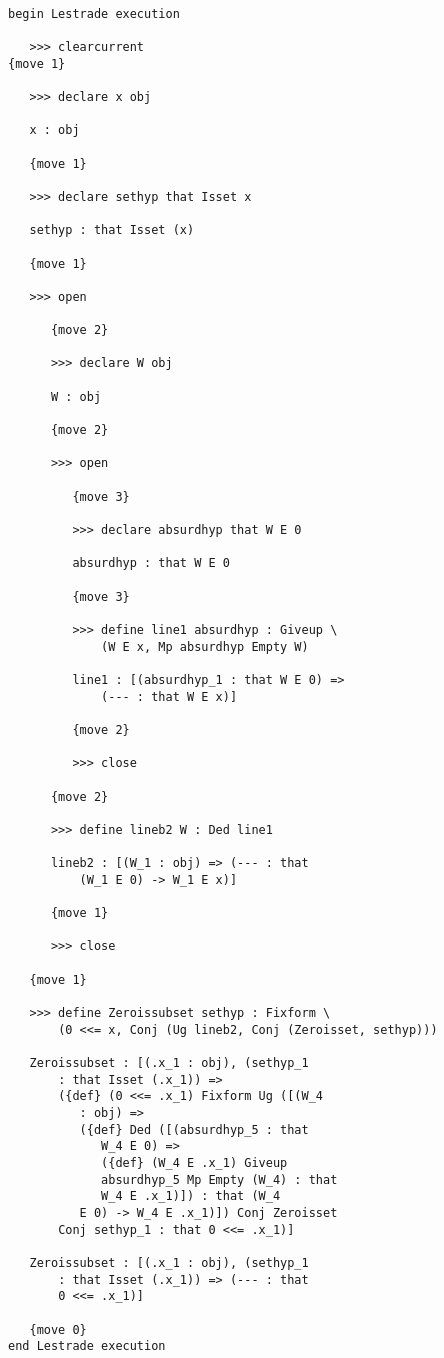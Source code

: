 \documentclass[12pt]{article}
\begin{document}
\begin{verbatim}

begin Lestrade execution

   >>> clearcurrent
{move 1}

   >>> declare x obj

   x : obj

   {move 1}

   >>> declare sethyp that Isset x

   sethyp : that Isset (x)

   {move 1}

   >>> open

      {move 2}

      >>> declare W obj

      W : obj

      {move 2}

      >>> open

         {move 3}

         >>> declare absurdhyp that W E 0

         absurdhyp : that W E 0

         {move 3}

         >>> define line1 absurdhyp : Giveup \
             (W E x, Mp absurdhyp Empty W)

         line1 : [(absurdhyp_1 : that W E 0) => 
             (--- : that W E x)]

         {move 2}

         >>> close

      {move 2}

      >>> define lineb2 W : Ded line1

      lineb2 : [(W_1 : obj) => (--- : that 
          (W_1 E 0) -> W_1 E x)]

      {move 1}

      >>> close

   {move 1}

   >>> define Zeroissubset sethyp : Fixform \
       (0 <<= x, Conj (Ug lineb2, Conj (Zeroisset, sethyp)))

   Zeroissubset : [(.x_1 : obj), (sethyp_1 
       : that Isset (.x_1)) => 
       ({def} (0 <<= .x_1) Fixform Ug ([(W_4 
          : obj) => 
          ({def} Ded ([(absurdhyp_5 : that 
             W_4 E 0) => 
             ({def} (W_4 E .x_1) Giveup 
             absurdhyp_5 Mp Empty (W_4) : that 
             W_4 E .x_1)]) : that (W_4 
          E 0) -> W_4 E .x_1)]) Conj Zeroisset 
       Conj sethyp_1 : that 0 <<= .x_1)]

   Zeroissubset : [(.x_1 : obj), (sethyp_1 
       : that Isset (.x_1)) => (--- : that 
       0 <<= .x_1)]

   {move 0}
end Lestrade execution
\end{verbatim}
\end{document}
